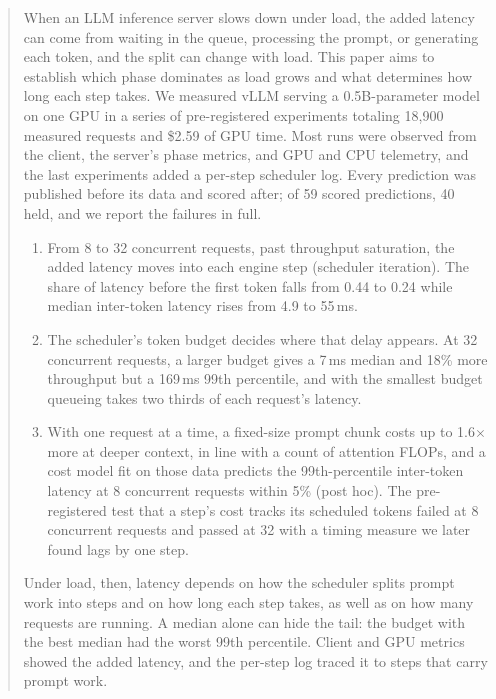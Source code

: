 \begin{abstract}
When an LLM inference server slows down under load, the added latency can come from
waiting in the queue, processing the prompt, or generating each token, and the split
can change with load. This paper aims to establish which phase dominates as load grows
and what determines how long each step takes. We measured vLLM serving a
0.5B-parameter model on one GPU in a series of pre-registered experiments totaling
18{,}900 measured requests and \$2.59 of GPU time. Most runs were observed from the
client, the server's phase metrics, and GPU and CPU telemetry, and the last
experiments added a per-step scheduler log. Every prediction was published before its
data and scored after; of 59 scored predictions, 40 held, and we report the failures
in full.

\begin{enumerate}[leftmargin=*,nosep]
  \item From 8 to 32 concurrent requests, past throughput saturation, the added
    latency moves into each engine step (scheduler iteration). The share of latency
    before the first token falls from 0.44 to 0.24 while median inter-token latency
    rises from 4.9 to 55\,ms.
  \item The scheduler's token budget decides where that delay appears. At 32
    concurrent requests, a larger budget gives a 7\,ms median and 18\% more
    throughput but a 169\,ms 99th percentile, and with the smallest budget queueing
    takes two thirds of each request's latency.
  \item With one request at a time, a fixed-size prompt chunk costs up to
    1.6$\times$ more at deeper context, in line with a count of attention FLOPs, and
    a cost model fit on those data predicts the 99th-percentile inter-token latency
    at 8 concurrent requests within 5\% (post hoc). The pre-registered test that a
    step's cost tracks its scheduled tokens failed at 8 concurrent requests and
    passed at 32 with a timing measure we later found lags by one step.
\end{enumerate}

Under load, then, latency depends on how the scheduler splits prompt work into steps
and on how long each step takes, as well as on how many requests are running. A median
alone can hide the tail: the budget with the best median had the worst 99th
percentile. Client and GPU metrics showed the added latency, and the per-step log
traced it to steps that carry prompt work.
\end{abstract}
